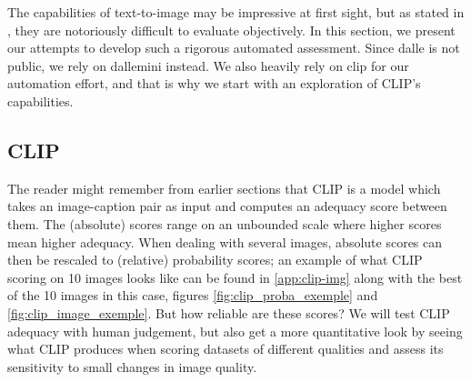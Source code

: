 \documentclass{article}
\begin{document}
\begin{multicols}{2}

The capabilities of text-to-image may be impressive at first sight, but as stated in \cite{probml-advanced}, they are notoriously difficult to evaluate objectively. In this section, we present our attempts to develop such a rigorous automated assessment. Since \gls{dalle} is not public, we rely on \gls{dallemini} instead. We also heavily rely on \gls{clip} for our automation effort, and that is why we start with an exploration of CLIP's capabilities.



\subsection{CLIP}

The reader might remember from earlier sections that CLIP is a model which takes an image-caption pair as input and computes an adequacy score between them. The (absolute) scores range on an unbounded scale where higher scores mean higher adequacy. When dealing with several images, absolute scores can then be rescaled to (relative) probability scores; an example of what CLIP scoring on 10 images looks like can be found in \ref{app:clip-img} along with the best of the 10 images in this case, figures \ref{fig:clip_proba_exemple} and \ref{fig:clip_image_exemple}. But how reliable are these scores? We will test CLIP adequacy with human judgement, but also get a more quantitative look by seeing what CLIP produces when scoring datasets of different qualities and assess its sensitivity to small changes in image quality.


\end{multicols}
\end{document}
